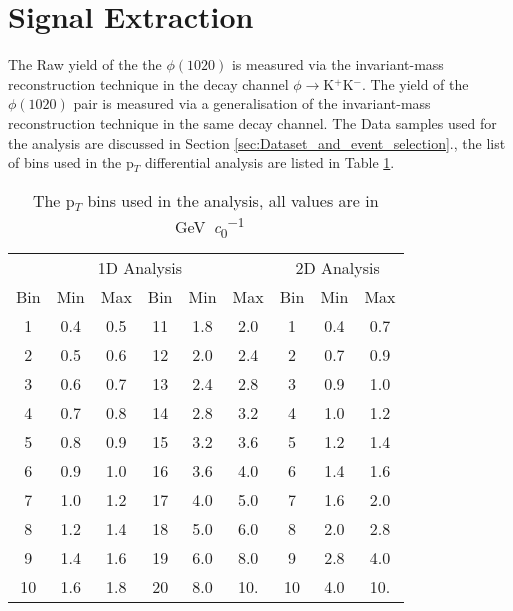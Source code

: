 \section{Signal Extraction}
\label{sec:SignalExtraction}
The Raw yield of the the $\phi(1020)$ is measured via the invariant-mass reconstruction technique in the decay channel $\phi \to $K$^+$K$^-$. The yield of the $\phi(1020)$ pair is measured via a generalisation of the invariant-mass reconstruction technique in the same decay channel. The Data samples used for the analysis are discussed in Section \ref{sec:Dataset_and_event_selection}., the list of bins used in the p$_T$ differential analysis are listed in Table \ref{tab:PTbins}.
\begin{table}
\center
\begin{tabular}{ccc|ccc||ccc}
\multicolumn{6}{c}{1D Analysis} 					&\multicolumn{3}{c}{2D Analysis}\\
Bin	&Min		&Max	&Bin		&Min		&Max	&Bin		&Min		&Max\\
\hline
1	&0.4		&0.5		&11		&1.8		&2.0		&1		&0.4		&0.7\\
2	&0.5		&0.6		&12		&2.0		&2.4		&2		&0.7		&0.9\\
3	&0.6		&0.7		&13		&2.4		&2.8		&3		&0.9		&1.0\\
4	&0.7		&0.8		&14		&2.8		&3.2		&4		&1.0		&1.2\\
5	&0.8		&0.9		&15		&3.2		&3.6		&5		&1.2		&1.4\\
6	&0.9		&1.0		&16		&3.6		&4.0		&6		&1.4		&1.6\\
7	&1.0		&1.2		&17		&4.0		&5.0		&7		&1.6		&2.0\\
8	&1.2		&1.4		&18		&5.0		&6.0		&8		&2.0		&2.8\\
9	&1.4		&1.6		&19		&6.0		&8.0		&9		&2.8		&4.0\\
10	&1.6		&1.8		&20 		&8.0		&10.		&10		&4.0		&10.\\
\end{tabular}
\caption{The p$_{T}$ bins used in the analysis, all values are in \SI{}{\giga \electronvolt \per \clight}}
\label{tab:PTbins}
\end{table}

